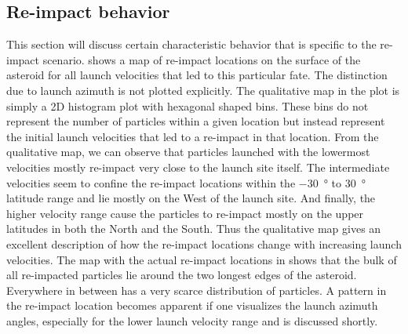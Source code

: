 \subsection{Re-impact behavior}
This section will discuss certain characteristic behavior that is specific to the re-impact scenario.  shows a map of re-impact locations on the surface of the asteroid for all launch velocities that led to this particular fate. The distinction due to launch azimuth is not plotted explicitly. The qualitative map in the plot is simply a 2D histogram plot with hexagonal shaped bins. These bins do not represent the number of particles within a given location but instead represent the initial launch velocities that led to a re-impact in that location. From the qualitative map, we can observe that particles launched with the lowermost velocities mostly re-impact very close to the launch site itself. The intermediate velocities seem to confine the re-impact locations within the \SI{-30}{\degree} to \SI{+30}{\degree} latitude range and lie mostly on the West of the launch site. And finally, the higher velocity range cause the particles to re-impact mostly on the upper latitudes in both the North and the South.
%
\newline\newline
%
Thus the qualitative map gives an excellent description of how the re-impact locations change with increasing launch velocities. The map with the actual re-impact locations in  shows that the bulk of all re-impacted particles lie around the two longest edges of the asteroid. Everywhere in between has a very scarce distribution of particles. A pattern in the re-impact location becomes apparent if one visualizes the launch azimuth angles, especially for the lower launch velocity range and is discussed shortly.
